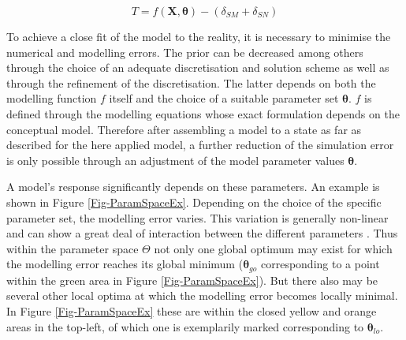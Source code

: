 \begin{equation}
    \label{Eq-CompSimTruth}
    T = f(\bm{X},\bm{\theta}) - (\delta_{SM} + \delta_{SN})
\end{equation}

To achieve a close fit of the model to the reality, it is necessary to minimise the numerical and modelling errors. 
The prior can be decreased among others through the choice of an adequate discretisation and solution scheme as well as through the refinement of the discretisation. 
The latter depends on both the modelling function $f$ itself and the choice of a suitable parameter set $\bm{\theta}$. 
$f$ is defined through the modelling equations whose exact formulation depends on the conceptual model. 
Therefore after assembling a model to a state as far as described for the here applied model, a further reduction of the simulation error is only possible through an adjustment of the model parameter values $\bm{\theta}$.

A model's response significantly depends on these parameters. 
An example is shown in Figure \ref{Fig-ParamSpaceEx}. 
Depending on the choice of the specific parameter set, the modelling error varies. 
This variation is generally non-linear and can show a great deal of interaction between the different parameters \parencite{Duan.1993}. 
Thus within the parameter space $\Theta$ not only one global optimum may exist for which the modelling error reaches its global minimum ($\bm{\theta}_{go}$ corresponding to a point within the green area in Figure \ref{Fig-ParamSpaceEx}). 
But there also may be several other local optima at which the modelling error becomes locally minimal. 
In Figure \ref{Fig-ParamSpaceEx} these are within the closed yellow and orange areas in the top-left, of which one is exemplarily marked corresponding to $\bm{\theta}_{lo}$.

